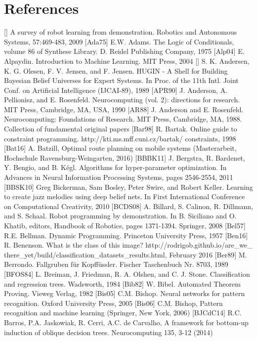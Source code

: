 \documentclass[10pt]{book}
\begin{document}
\chapter{References}
[\cite{acm2009survey}] A survey of robot learning from demonstration. Robotics and Autonomous Systems, 57:469-483, 2009
[Ada75] E.W. Adams. The Logic of Conditionals, volume 86 of Synthese Library. D. Reidel Publishing Company, 1975
[Alp04] E. Alpaydin. Introduction to Machine Learning. MIT Press, 2004
[\cite{andersen1989hugin}] S. K. Andersen, K. G. Olesen, F. V. Jensen, and F. Jensen. HUGIN - A Shell for Building Bayesian Belief Universes for Expert Systems. In Proc. of the 11th Intl. Joint Conf. on Artificial Intelligence (IJCAI-89), 1989
[APR90] J. Anderson, A. Pellionisz, and E. Rosenfeld. Neurocomputing (vol. 2): directions for research. MIT Press, Cambridge, MA, USA, 1990
[AR88] J. Anderson and E. Rosenfeld. Neurocomputing: Foundations of Research. MIT Press, Cambridge, MA, 1988. Collection of fundamental original papers
[Bar98] R. Bartak. Online guide to constraint programming. http://kti.ms.mff.cuni.cz/bartak/ constraints, 1998
[Bat16] A. Batzill, Optimal route planning on mobile systems (Masterarbeit, Hochschule Ravensburg-Weingarten, 2016)
[BBBK11] J. Bergstra, R. Bardenet, Y. Bengio, and B. Kégl. Algorithms for hyper-parameter optimization. In Advances in Neural Information Processing Systems, pages 2546-2554, 2011
[BBSK10] Greg Bickerman, Sam Bosley, Peter Swire, and Robert Keller. Learning to create jazz melodies using deep belief nets. In First International Conference on Computational Creativity, 2010
[BCDS08] A. Billard, S. Calinon, R. Dillmann, and S. Schaal. Robot programming by demonstration. In B. Siciliano and O. Khatib, editors, Handbook of Robotics, pages 1371-1394. Springer, 2008
[Bel57] R.E. Bellman. Dynamic Programming. Princeton University Press, 1957
[Ben16] R. Benenson. What is the class of this image? http://rodrigob.github.io/are\_we\_ there\_yet/build/classification\_datasets\_results.html, February 2016
[Ber89] M. Berrondo. Fallgruben für Kopffüssler. Fischer Taschenbuch Nr. 8703, 1989
[BFOS84] L. Breiman, J. Friedman, R. A. Olshen, and C. J. Stone. Classification and regression trees. Wadsworth, 1984
[Bib82] W. Bibel. Automated Theorem Proving. Vieweg Verlag, 1982
[Bis05] C.M. Bishop. Neural networks for pattern recognition. Oxford University Press, 2005
[Bis06] C.M. Bishop, Pattern recognition and machine learning (Springer, New York, 2006)
[BJCdC14] R.C. Barros, P.A. Jaskowiak, R. Cerri, A.C. de Carvalho, A framework for bottom-up induction of oblique decision trees. Neurocomputing 135, 3-12 (2014)
\end{document}
